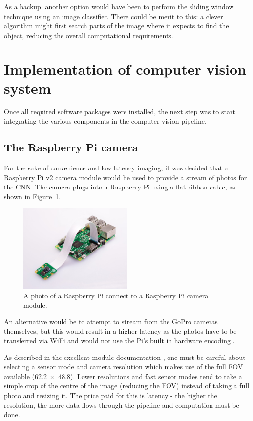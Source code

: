 As a backup, another option would have been to perform the sliding window technique using an image classifier. There could be merit to this: a clever algorithm might first search parts of the image where it expects to find the object, reducing the overall computational requirements.


\section{Implementation of computer vision system}
Once all required software packages were installed, the next step was to start integrating the various components in the computer vision pipeline.

\subsection{The Raspberry Pi camera}
For the sake of convenience and low latency imaging, it was decided that a Raspberry Pi v2 camera module would be used to provide a stream of photos for the CNN. The camera plugs into a Raspberry Pi using a flat ribbon cable, as shown in Figure~\ref{fig:r_pi_camera}.

\begin{figure}[h!]
  \centering
  \includegraphics[width=0.5\textwidth]{methodology/r_pi_camera}
  \caption{\label{fig:r_pi_camera}A photo of a Raspberry Pi connect to a Raspberry Pi camera module.}
\end{figure}

An alternative would be to attempt to stream from the GoPro cameras themselves, but this would result in a higher latency as the photos have to be transferred via WiFi and would not use the Pi's built in hardware encoding \cite{website:gopro_to_rpi, website:gopro_to_rpi2}.

As described in the excellent  module documentation \cite{website:picamera_hardware}, one must be careful about selecting a sensor mode and camera resolution which makes use of the full FOV available (62.2\textdegree $\ \times$ 48.8\textdegree). Lower resolutions and fast sensor modes tend to take a simple crop of the centre of the image (reducing the FOV) instead of taking a full photo and resizing it. The price paid for this is latency - the higher the resolution, the more data flows through the pipeline and computation must be done.

